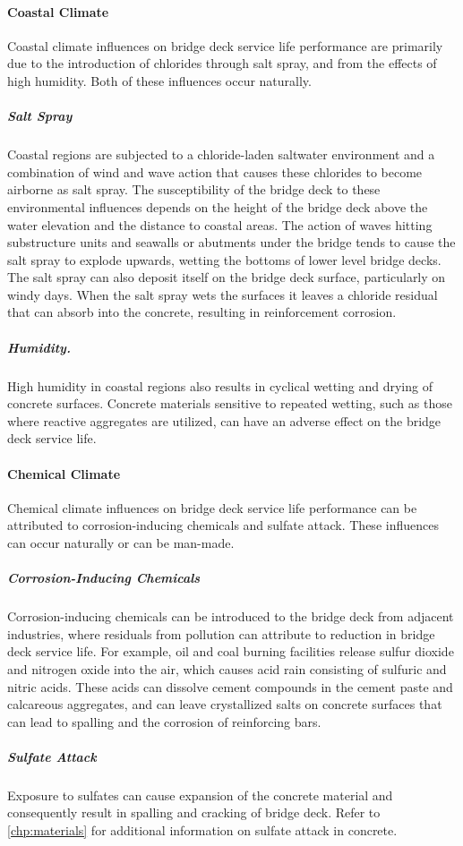 \paragraph{Coastal Climate}
Coastal climate influences on bridge deck service life performance are primarily due to the introduction of chlorides through salt spray, and from the effects of high humidity. Both of these influences occur naturally.

\subparagraph*{Salt Spray}
Coastal regions are subjected to a chloride-laden saltwater environment and a combination of wind and wave action that causes these chlorides to become airborne as salt spray. The susceptibility of the bridge deck to these environmental influences depends on the height of the bridge deck above the water elevation and the distance to coastal areas. The action of waves hitting substructure units and seawalls or abutments under the bridge tends to cause the salt spray to explode upwards, wetting the bottoms of lower level bridge decks. The salt spray can also deposit itself on the bridge deck surface, particularly on windy days. When the salt spray wets the surfaces it leaves a chloride residual that can absorb into the concrete, resulting in reinforcement corrosion.

\subparagraph*{Humidity.}
High humidity in coastal regions also results in cyclical wetting and drying of concrete surfaces.  Concrete materials sensitive to repeated wetting, such as those where reactive aggregates are utilized, can have an adverse effect on the bridge deck service life.

\paragraph{Chemical Climate}
Chemical climate influences on bridge deck service life performance can be attributed to corrosion-inducing chemicals and sulfate attack. These influences can occur naturally or can be man-made.

\subparagraph*{Corrosion-Inducing Chemicals}
Corrosion-inducing chemicals can be introduced to the bridge deck from adjacent industries, where residuals from pollution can attribute to reduction in bridge deck service life. For example, oil and coal burning facilities release sulfur dioxide and nitrogen oxide into the air, which causes acid rain consisting of sulfuric and nitric acids. These acids can dissolve cement compounds in the cement paste and calcareous aggregates, and can leave crystallized salts on concrete surfaces that can lead to spalling and the corrosion of reinforcing bars.
\subparagraph*{Sulfate Attack}
Exposure to sulfates can cause expansion of the concrete material and consequently result in spalling and cracking of bridge deck. Refer to \cref{chp:materials} for additional information on sulfate attack in concrete.

